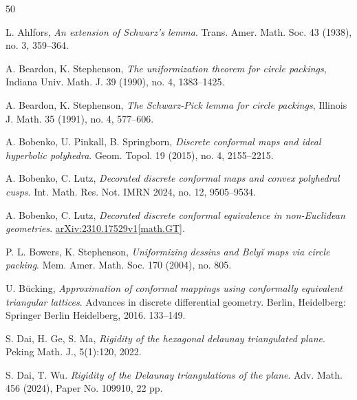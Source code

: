 \documentclass[12pt]{amsart}
\theoremstyle{definition}
\begin{document}
\begin{thebibliography}{50}
\setlength{\itemsep}{2pt} \small

 L. Ahlfors,  \emph{An extension of Schwarz's lemma}. Trans. Amer. Math. Soc. 43 (1938), no. 3, 359--364.

 A. Beardon, K. Stephenson, \emph{The uniformization theorem for circle packings}, Indiana Univ. Math. J. 39 (1990), no. 4, 1383--1425.

 A. Beardon, K. Stephenson, \emph{The Schwarz-Pick lemma for circle packings}, Illinois J. Math. 35 (1991), no. 4, 577--606.

 A. Bobenko, U. Pinkall, B. Springborn, \emph{Discrete conformal maps and ideal hyperbolic polyhedra}. Geom. Topol. 19 (2015), no. 4, 2155--2215.

 A. Bobenko, C. Lutz, \emph{Decorated discrete conformal maps and convex polyhedral cusps}. Int. Math. Res. Not. IMRN 2024, no. 12, 9505--9534.


 A. Bobenko, C. Lutz, \emph{Decorated discrete conformal equivalence in non-Euclidean geometries}. \href{https://arxiv.org/abs/2310.17529}{arXiv:2310.17529v1[math.GT]}.




 P. L. Bowers, K. Stephenson, \emph{Uniformizing dessins and Bely\u{i} maps via circle packing}. Mem. Amer. Math. Soc. 170 (2004), no. 805.


 U. B\"{u}cking, \emph{Approximation of conformal mappings using conformally equivalent triangular lattices}. Advances in discrete differential geometry. Berlin, Heidelberg: Springer Berlin Heidelberg, 2016. 133--149.


 S. Dai, H. Ge, S. Ma, \emph{Rigidity of the hexagonal delaunay triangulated plane}. Peking Math. J., 5(1):120, 2022.

 S. Dai, T. Wu. \emph{Rigidity of the Delaunay triangulations of the plane}. Adv. Math. 456 (2024), Paper No. 109910, 22 pp.


\end{thebibliography}
\end{document}
